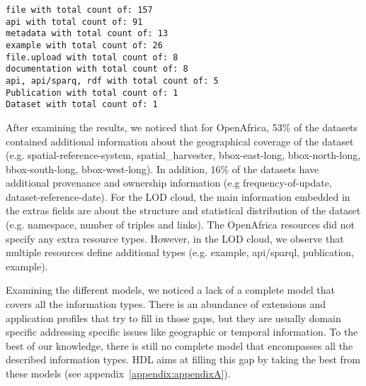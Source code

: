 \begin{lstlisting}
file with total count of: 157
api with total count of: 91
metadata with total count of: 13
example with total count of: 26
file.upload with total count of: 8
documentation with total count of: 8
api, api/sparq, rdf with total count of: 5
Publication with total count of: 1
Dataset with total count of: 1
\end{lstlisting}

After examining the results, we noticed that for OpenAfrica, 53\% of the datasets contained additional information about the geographical coverage of the dataset (e.g. spatial-reference-system, spatial\_harvester, bbox-east-long, bbox-north-long, bbox-south-long, bbox-west-long). In addition, 16\% of the datasets have additional provenance and ownership information (e.g frequency-of-update, dataset-reference-date). For the LOD cloud, the main information embedded in the extras fields are about the structure and statistical distribution of the dataset (e.g. namespace, number of triples and links). The OpenAfrica resources did not specify any extra resource types. However, in the LOD cloud, we observe that multiple resources define additional types (e.g. example, api/sparql, publication, example).

Examining the different models, we noticed a lack of a complete model that covers all the information types. There is an abundance of extensions and application profiles that try to fill in those gaps, but they are usually domain specific addressing specific issues like geographic or temporal information. To the best of our knowledge, there is still no complete model that encompasses all the described information types. HDL aims at filling this gap by taking the best from these models (see appendix~\ref{appendix:appendixA}).

